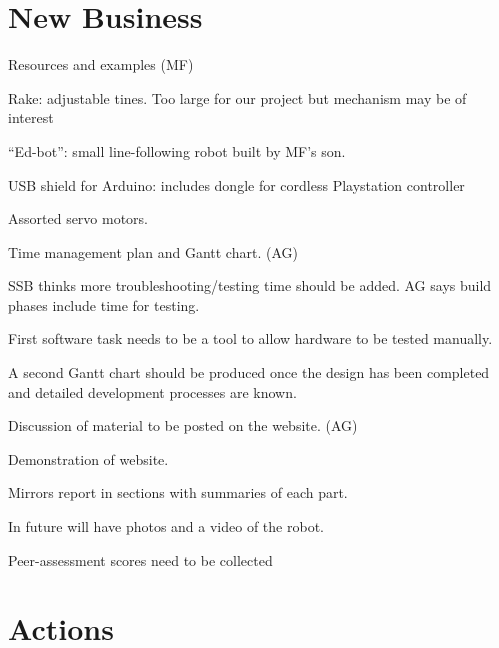 \documentclass[a4paper,11pt,twoside,class=meetingmins,crop=false]{standalone}
\begin{document}
\section{New Business}
\begin{items}
    \item Resources and examples (MF)
    \begin{subitems}
        \item Rake: adjustable tines. Too large for our project but mechanism may be of interest
        \item ``Ed-bot'': small line-following robot built by MF's son.
        \item USB shield for Arduino: includes dongle for cordless Playstation controller
        \item Assorted servo motors.
    \end{subitems}
    \item Time management plan and Gantt chart. (AG)
        \begin{subitems}
            \item SSB thinks more troubleshooting/testing time should be added. AG says build phases include time for testing.
            \item First software task needs to be a tool to allow hardware to be tested manually.
            \item A second Gantt chart should be produced once the design has been completed and detailed development processes are known.
        \end{subitems}
    \item Discussion of material to be posted on the website. (AG)
    \begin{subitems}
        \item Demonstration of website.
        \item Mirrors report in sections with summaries of each part.
        \item In future will have photos and a video of the robot.
    \end{subitems}
    \item Peer-assessment scores need to be collected
\end{items}

\vspace{1em}
\vspace{1em}

\section{Actions}
\begin{items}
\end{items}
\end{document}
